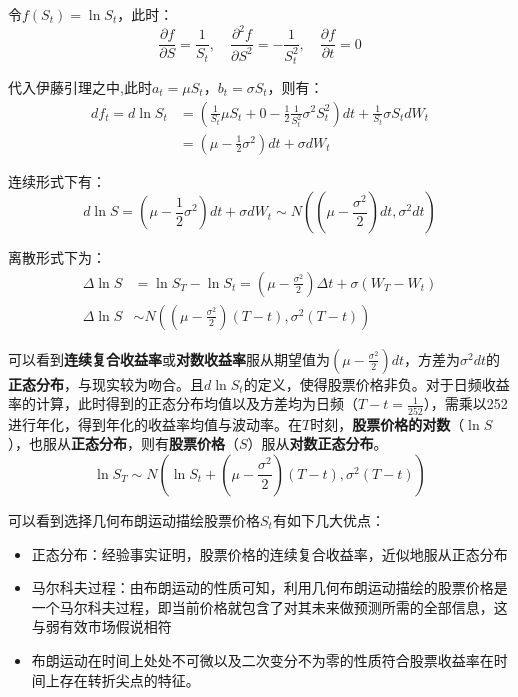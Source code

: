 \documentclass[11pt]{article}
\begin{document}
令$f(S_t) = \ln S_t$，此时：
\begin{equation*}
    \frac{\partial f}{\partial S} = \frac{1}{S_t}, \quad
    \frac{\partial^2 f}{\partial S^2} = -\frac{1}{S_t^2}, \quad
    \frac{\partial f}{\partial t} = 0
\end{equation*}

代入伊藤引理之中,此时$a_t=\mu S_t$，$b_t=\sigma S_t$，则有：
\begin{align*}
    df_t = d \ln S_t & = \left( \frac{1}{S_t}\mu S_t + 0 - \frac{1}{2} \frac{1}{S_t^2} \sigma^2 S_t^2 \right) dt + \frac{1}{S_t}\sigma S_t dW_t \\
    & = \left( \mu - \frac{1}{2}\sigma^2\right)dt + \sigma dW_t
\end{align*}

连续形式下有：
\begin{equation*}
    d\ln S = \left( \mu - \frac{1}{2}\sigma^2\right) dt + \sigma dW_t \sim N \left( (\mu-\frac{\sigma^2}{2})dt, \sigma^2 dt \right)
\end{equation*}

离散形式下为：
\begin{align*}
    \Delta \ln S &= \ln S_T - \ln S_t = \left( \mu - \frac{\sigma^2}{2} \right) \Delta t + \sigma (W_T - W_t) \\
    \Delta \ln S &\sim N \left((\mu-\frac{\sigma^2}{2})(T-t), \sigma^2(T-t) \right)
\end{align*}

可以看到\textbf{连续复合收益率}或\textbf{对数收益率}服从期望值为$(\mu - \tfrac{\sigma^2}{2})dt$，方差为$\sigma^2 dt$的\textbf{正态分布}，与现实较为吻合。且$d\ln S_t$的定义，使得股票价格非负。对于日频收益率的计算，此时得到的正态分布均值以及方差均为日频（$T-t=\frac{1}{252}$），需乘以252进行年化，得到年化的收益率均值与波动率。在$T$时刻，\textbf{股票价格的对数}（$\ln S$），也服从\textbf{正态分布}，则有\textbf{股票价格}（$S$）服从\textbf{对数正态分布}。
\begin{equation*}
    \ln S_T  \sim N \left(\ln S_t + (\mu-\frac{\sigma^2}{2})(T-t), \sigma^2(T-t)\right)
\end{equation*}

可以看到选择几何布朗运动描绘股票价格$S_t$有如下几大优点：
\begin{itemize}[leftmargin=4em]
    \item 正态分布：经验事实证明，股票价格的连续复合收益率，近似地服从正态分布
    \item 马尔科夫过程：由布朗运动的性质可知，利用几何布朗运动描绘的股票价格是一个马尔科夫过程，即当前价格就包含了对其未来做预测所需的全部信息，这与弱有效市场假说相符
    \item 布朗运动在时间上处处不可微以及二次变分不为零的性质符合股票收益率在时间上存在转折尖点的特征。
\end{itemize}
\end{document}
